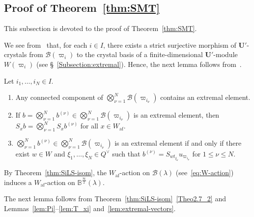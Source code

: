 \documentclass[ALCO,ThmDefs,Unicode,epreuves]{cedram}
\newcommand\bm[1]{\boldsymbol{#1}}
\renewcommand{\U}{\mathbf{U}}
\newcommand{\si}{\frac{\infty}{2}}
\DeclareMathOperator{\af}{af}
\begin{document}
\subsection{Proof of Theorem~\ref{thm:SMT}} \label{Subsection:pf-SMT}
This subsection is devoted to the proof of Theorem~\ref{thm:SMT}.

We see from~\cite[Theorem~5.17]{K02} 
that, for each $i \in I$, there exists a strict surjective morphism of $\U'$-crystals from 
$\mathcal{B}(\varpi_i)$
to the crystal basis of a finite-dimensional $\U'$-module
$W(\varpi_i)$ (see \S~\ref{Subsection:extremal}). 
Hence, the next lemma follows from~\cite[Lemmas~1.5--1.6]{AK}. 

\begin{lemm} \label{lem:extremal-vectors}
Let 
$i_1 , \ldots , i_N \in I$. 
\begin{enumerate}[label=(\arabic*)]
\item\label{Theo3.6_1}
Any connected component of 
$\bigotimes_{\nu = 1}^N \mathcal{B}(\varpi_{i_{\nu}})$ 
contains an extremal element.
\item\label{Theo3.6_2}
If 
$b = \bigotimes_{\nu = 1}^N b^{(\nu)} \in \bigotimes_{\nu = 1}^N \mathcal{B}(\varpi_{i_{\nu}})$
is an extremal element, then 
$S_x b = \bigotimes_{\nu = 1}^N S_x b^{(\nu)}$ 
for all 
$x \in W_{\af}$. 
\item\label{Theo3.6_3}
$\bigotimes_{\nu = 1}^N b^{(\nu)} \in \bigotimes_{\nu = 1}^N \mathcal{B}(\varpi_{i_{\nu}})$
is an extremal element if and only if there exist
$w \in W$ 
and 
$\xi_1 , \ldots , \xi_N \in Q^{\vee}$ 
such that 
$b^{(\nu)} = S_{wt_{\xi_{\nu}}} u_{\varpi_{i_{\nu}}}$
for 
$1 \leq \nu \leq N$. 
\end{enumerate}
\end{lemm}

By Theorem~\ref{thm:SiLS-isom}, 
the $W_{\af}$-action on $\mathcal{B}(\lambda)$ (see~\eqref{eq:W-action})
induces a $W_{\af}$-action on $\mathbb{B}^{\si}(\lambda)$.

The next lemma follows from 
Theorem~\ref{thm:SiLS-isom}~\ref{Theo2.7_2} and 
Lemmas~\ref{lem:Pi}--\ref{lem:T_xi} and~\ref{lem:extremal-vectors}.
\end{document}
